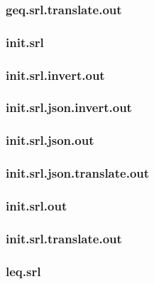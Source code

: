 \subsubsection{geq.srl.translate.out}
\label{app:geq_srl.translate.out}

\subsubsection{init.srl}
\label{app:init_srl}

\subsubsection{init.srl.invert.out}
\label{app:init_srl.invert.out}

\subsubsection{init.srl.json.invert.out}
\label{app:init_srl.json.invert.out}

\subsubsection{init.srl.json.out}
\label{app:init_srl.json.out}

\subsubsection{init.srl.json.translate.out}
\label{app:init_srl.json.translate.out}

\subsubsection{init.srl.out}
\label{app:init_srl.out}

\subsubsection{init.srl.translate.out}
\label{app:init_srl.translate.out}

\subsubsection{leq.srl}
\label{app:leq_srl}

